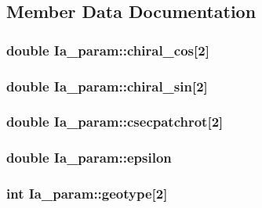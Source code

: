 \subsection{Member Data Documentation}
\hypertarget{struct_ia__param_aca5d2f928a51400f45ba6d3b1370b586}{
\subsubsection[{chiral\+\_\+cos}]{\setlength{\rightskip}{0pt plus 5cm}double Ia\+\_\+param\+::chiral\+\_\+cos\mbox{[}2\mbox{]}}}\label{struct_ia__param_aca5d2f928a51400f45ba6d3b1370b586}
\hypertarget{struct_ia__param_a569adcf853f7e6f7ccf0515928249bb6}{
\subsubsection[{chiral\+\_\+sin}]{\setlength{\rightskip}{0pt plus 5cm}double Ia\+\_\+param\+::chiral\+\_\+sin\mbox{[}2\mbox{]}}}\label{struct_ia__param_a569adcf853f7e6f7ccf0515928249bb6}
\hypertarget{struct_ia__param_a7f94789a785201573c04d8c5e71dc9fa}{
\subsubsection[{csecpatchrot}]{\setlength{\rightskip}{0pt plus 5cm}double Ia\+\_\+param\+::csecpatchrot\mbox{[}2\mbox{]}}}\label{struct_ia__param_a7f94789a785201573c04d8c5e71dc9fa}
\hypertarget{struct_ia__param_afc12bb1527874046f8d8a5769493b142}{
\subsubsection[{epsilon}]{\setlength{\rightskip}{0pt plus 5cm}double Ia\+\_\+param\+::epsilon}}\label{struct_ia__param_afc12bb1527874046f8d8a5769493b142}
\hypertarget{struct_ia__param_a3ff31140f1898b4792a39745eec89a2e}{
\subsubsection[{geotype}]{\setlength{\rightskip}{0pt plus 5cm}int Ia\+\_\+param\+::geotype\mbox{[}2\mbox{]}}}\label{struct_ia__param_a3ff31140f1898b4792a39745eec89a2e}
